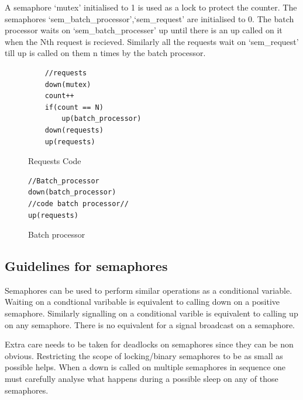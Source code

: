 \documentclass[12pt]{article}
\begin{document}
A semaphore `mutex' initialised to 1 is used as a lock to protect the counter. The semaphores `sem\_batch\_processor',`sem\_request' are initialised to 0.
The batch processor waits on `sem\_batch\_processer' up until there is an up called on it when the Nth request is recieved. Similarly all the requests wait on 
`sem\_request' till up is called on them n times by the batch processor. 


\begin{figure}[H]
    \begin{minipage}{.5\textwidth}
    \begin{tcolorbox}[colback=red!5!white,colframe=red!75!black]
    \begin{verbatim}
    //requests
    down(mutex)
    count++
    if(count == N)
        up(batch_processor)
    down(requests)
    up(requests)
    \end{verbatim}
    \end{tcolorbox}
    \caption{Requests Code}
    \end{minipage}
    \hspace{0.05\textwidth}
    \begin{minipage}{.5\textwidth}
    \begin{tcolorbox}[colback=blue!5!white,colframe=blue!75!black]
    \begin{verbatim}
//Batch_processor
down(batch_processor)
//code batch processor//
up(requests)
    \end{verbatim}
    \end{tcolorbox}
    \caption{Batch processor}
    \end{minipage}
    \end{figure}    



\subsection{Guidelines for semaphores}
Semaphores can be used to perform similar operations as a conditional variable. Waiting on a condtional varibable is equivalent to calling down on a positive semaphore. Similarly signalling on a conditional varible 
is equivalent to calling up on any semaphore. There is no equivalent for a signal broadcast on a semaphore. 

Extra care needs to be taken for deadlocks on semaphores since they can be non obvious. Restricting the scope of locking/binary semaphores to be as small as possible helps. When a down is called on multiple semaphores in sequence one must carefully analyse what happens during a possible 
sleep on any of those semaphores.
\end{document}

